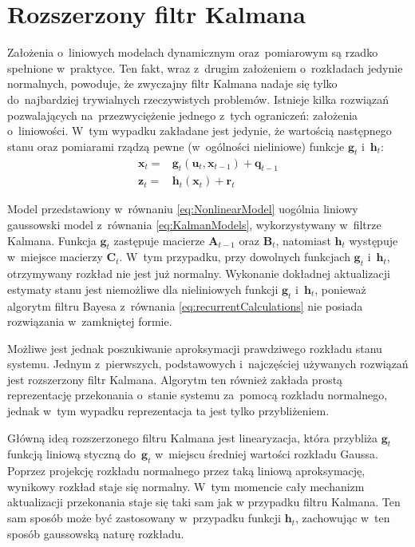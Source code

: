 \section{Rozszerzony filtr Kalmana} \label{ExtendedKalmanFilter}
Założenia o~liniowych modelach dynamicznym oraz~pomiarowym są rzadko spełnione w~praktyce. Ten fakt, wraz z~drugim założeniem o~rozkładach jedynie normalnych, powoduje, że zwyczajny filtr Kalmana nadaje się tylko do~najbardziej trywialnych rzeczywistych problemów. Istnieje kilka rozwiązań pozwalających na~przezwyciężenie jednego z~tych ograniczeń: założenia o~liniowości. W~tym wypadku zakładane jest jedynie, że wartością następnego stanu oraz pomiarami rządzą pewne (w~ogólności nieliniowe) funkcje $\boldsymbol{g}_t$ i~$\boldsymbol{h}_t$:
\begin{align} 
\boldsymbol{x}_t =& \boldsymbol{g}_t(\boldsymbol{u}_t, \boldsymbol{x}_{t-1}) + \boldsymbol{q}_{t-1} \nonumber \\
\boldsymbol{z}_t =& \boldsymbol{h}_t(\boldsymbol{x}_{t}) + \boldsymbol{r}_{t} \label{eq:NonlinearModel}
\end{align}
\par
Model przedstawiony w~równaniu \ref{eq:NonlinearModel} uogólnia liniowy gaussowski model z~równania \ref{eq:KalmanModels}, wykorzystywany w~filtrze Kalmana. Funkcja $\boldsymbol{g}_t$ zastępuje macierze $\boldsymbol{A}_{t-1}$ oraz $\boldsymbol{B}_{t}$, natomiast $\boldsymbol{h}_t$ występuje w~miejsce macierzy $\boldsymbol{C}_t$. W~tym przypadku, przy dowolnych funkcjach $\boldsymbol{g}_t$ i~$\boldsymbol{h}_t$, otrzymywany rozkład nie jest już normalny. Wykonanie dokładnej aktualizacji estymaty stanu jest niemożliwe dla nieliniowych funkcji $\boldsymbol{g}_t$ i~$\boldsymbol{h}_t$, ponieważ algorytm filtru Bayesa z~równania \ref{eq:recurrentCalculations} nie posiada rozwiązania w~zamkniętej formie.
\par
Możliwe jest jednak poszukiwanie aproksymacji prawdziwego rozkładu stanu systemu. Jednym z~pierwszych, podstawowych i~najczęściej używanych rozwiązań jest rozszerzony filtr Kalmana. Algorytm ten również zakłada prostą reprezentację przekonania o~stanie systemu za~pomocą rozkładu normalnego, jednak w~tym wypadku reprezentacja ta jest tylko przybliżeniem.
\par
Główną ideą rozszerzonego filtru Kalmana jest linearyzacja, która przybliża $\boldsymbol{g}_t$ funkcją liniową styczną do~$\boldsymbol{g}_t$ w~miejscu średniej wartości rozkładu Gaussa. Poprzez projekcję rozkładu normalnego przez taką liniową aproksymację, wynikowy rozkład staje się normalny. W~tym momencie cały mechanizm aktualizacji przekonania staje się taki sam jak w przypadku filtru Kalmana. Ten sam sposób może być zastosowany w~przypadku funkcji $\boldsymbol{h}_t$, zachowując w~ten sposób gaussowską naturę rozkładu.
